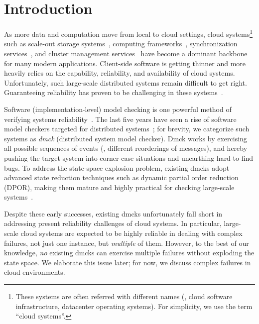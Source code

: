 


\chapter{Introduction}
\label{sec-intro}

As more data and computation move from local to cloud settings, cloud
systems\footnote[1]{These systems are often referred with different
  names (\eg, cloud software infrastructure, datacenter operating
  systems). For simplicity, we use the term ``cloud systems''.}  such
as scale-out storage systems~\cite{Chang+06-BigTable,
  DeCandia+07-Dynamo, Ghemawat+03-GoogleFS, Nightingale+12-FlatFDS},
computing frameworks~\cite{DeanGhemawat04-MapReduce,
  Murray+13-NaiadTimelyDataflow}, synchronization
services~\cite{Burrows06-Chubby, Hunt+10-ZooKeeperPaper}, and cluster
management services~\cite{Hindman+11-Mesos, Kumar+13-Yarn} have become
a dominant backbone for many modern applications.  Client-side software is
getting thinner and more heavily relies on the capability,
reliability, and availability of cloud systems.  Unfortunately, such
large-scale distributed systems remain difficult to get right.
Guaranteeing reliability has proven to be challenging in these
systems~\cite{Gunawi+11-FateDestini,  Guo+11-Demeter, Yang+09-Modist}.




Software (implementation-level) model checking is one powerful method
of verifying systems reliability~\cite{Godefroid+97-Verisoft,
  Yang+06-Explode, Yang+04-FiSC}.  The last five years have seen a
rise of software model checkers targeted for distributed
systems~\cite{Guerraoui+11-McNoNetwork, Guo+11-Demeter, Simsa+10-Dbug,
  Yabandeh+09-CrystalBall, Yang+09-Modist}; for brevity, we categorize
such systems as {\em dmck} (distributed system model checker).  Dmck
works by exercising all possible sequences of events (\eg, different
reorderings of messages), and hereby pushing the target system into
corner-case situations and unearthing hard-to-find bugs.  To address
the state-space explosion problem, existing dmcks adopt advanced state
reduction techniques such as dynamic partial order reduction (DPOR),
making them mature and highly practical for checking large-scale
systems~\cite{Guo+11-Demeter, Yang+09-Modist}.


Despite these early successes, existing dmcks unfortunately fall short
in addressing present reliability challenges of cloud systems.  In
particular, large-scale cloud systems are expected to be highly reliable
in dealing with complex failures, not just one instance, but {\em multiple}
of them.  However, to the best of our knowledge, {\em no} existing
dmcks can exercise multiple failures without exploding the state space.
We elaborate this issue later; for now, we discuss complex failures in
cloud environments.

